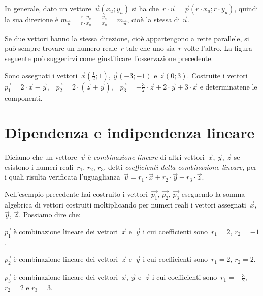 In generale, dato un vettore~$\vec{u}(x_u;y_u)$ si ha che~$r \cdot \vec{u} = \vec{p}(r \cdot x_u; r \cdot y_u)$, quindi la sua direzione è $m_{\vec{p}}=\frac{r \cdot y_u}{r \cdot x_u}=\frac{y_u}{x_u}= m_{\vec{u}}$, cioè la stessa di $\vec{u}$.

\begin{osservazione}
Se due vettori hanno la stessa direzione, cioè appartengono a rette parallele, si può sempre trovare un numero reale~$r$
tale che uno sia~$r$ volte l'altro. La figura seguente può suggerirvi come giustificare l'osservazione precedente.
\begin{center}
 
\end{center}
\end{osservazione}

\begin{exrig}
\begin{esempio}

Sono assegnati i vettori~$\vec{x}(\frac {1}{2};1)$, $\vec{y}(-3;-1)$ e $\vec{z}(0;3)$.
Costruite i vettori~$\vec{p_1}=2 \cdot \vec{x}-\vec{y}$,~~$\vec{p_2}=2 \cdot (\vec{z}+\vec{y})$,~~$\vec{p_3}=-\frac {3}{2} \cdot \vec{z} +2 \cdot \vec{y}+3 \cdot \vec{x}$
e determinatene le componenti.
\end{esempio}
\end{exrig}


\ovalbox{\risolvii \ref{ese:B.4}, \ref{ese:B.5}, \ref{ese:B.6}}

\section{Dipendenza e indipendenza lineare}

\begin{definizione}
Diciamo che un vettore~$\vec{v}$ è \emph{combinazione lineare} di altri vettori~$\vec{x}$, $\vec{y}$, $\vec{z}$ se esistono
i numeri reali~$r_1$, $r_2$, $r_3$, detti \emph{coefficienti della combinazione lineare}, per i quali risulta verificata
l'uguaglianza~$\vec{v}=r_1 \cdot \vec{x} + r_2 \cdot \vec{y} + r_3 \cdot \vec{z}$.
\end{definizione}
\begin{exrig}
\begin{esempio}
Nell'esempio precedente hai costruito i vettori~$\vec{p_1}$, $\vec{p_2}$, $\vec{p_3}$ eseguendo la somma algebrica di vettori costruiti moltiplicando
per numeri reali i vettori assegnati~$\vec{x}$, $\vec{y}$, $\vec{z}$. Possiamo dire che:
\begin{itemize*}
\item $\vec{p_1}$ è combinazione lineare dei vettori~$\vec{x}$ e~$\vec{y}$ i cui coefficienti sono~$r_1=2$, $r_2=-1$.
\item $\vec{p_2}$ è combinazione lineare dei vettori~$\vec{z}$ e~$\vec{y}$ i cui coefficienti sono~$r_1=2$, $r_2=2$.
\item $\vec{p_3}$ è combinazione lineare dei vettori~$\vec{x}$, $\vec{y}$ e~$\vec{z}$ i cui coefficienti sono~$r_1=-\frac{3}{2}$, $r_2=2$ e $r_3=3$.
\end{itemize*}
\end{esempio}
\end{exrig}

